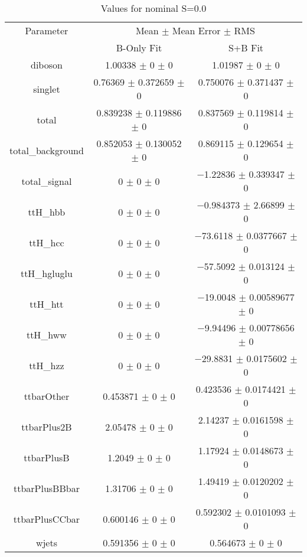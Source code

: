 \begin{table}
\centering
\caption{Values for nominal S=0.0}
\begin{tabular}{ccc}
\toprule
Parameter & \multicolumn{2}{c}{Mean $\pm$ Mean Error $\pm$ RMS}\\
 & B-Only Fit & S+B Fit\\
\midrule
diboson & \num{1.00338} $\pm$ \num{0} $\pm$ \num{0} & \num{1.01987} $\pm$ \num{0} $\pm$ \num{0}\\
singlet & \num{0.76369} $\pm$ \num{0.372659} $\pm$ \num{0} & \num{0.750076} $\pm$ \num{0.371437} $\pm$ \num{0}\\
total & \num{0.839238} $\pm$ \num{0.119886} $\pm$ \num{0} & \num{0.837569} $\pm$ \num{0.119814} $\pm$ \num{0}\\
total\_background & \num{0.852053} $\pm$ \num{0.130052} $\pm$ \num{0} & \num{0.869115} $\pm$ \num{0.129654} $\pm$ \num{0}\\
total\_signal & \num{0} $\pm$ \num{0} $\pm$ \num{0} & \num{-1.22836} $\pm$ \num{0.339347} $\pm$ \num{0}\\
ttH\_hbb & \num{0} $\pm$ \num{0} $\pm$ \num{0} & \num{-0.984373} $\pm$ \num{2.66899} $\pm$ \num{0}\\
ttH\_hcc & \num{0} $\pm$ \num{0} $\pm$ \num{0} & \num{-73.6118} $\pm$ \num{0.0377667} $\pm$ \num{0}\\
ttH\_hgluglu & \num{0} $\pm$ \num{0} $\pm$ \num{0} & \num{-57.5092} $\pm$ \num{0.013124} $\pm$ \num{0}\\
ttH\_htt & \num{0} $\pm$ \num{0} $\pm$ \num{0} & \num{-19.0048} $\pm$ \num{0.00589677} $\pm$ \num{0}\\
ttH\_hww & \num{0} $\pm$ \num{0} $\pm$ \num{0} & \num{-9.94496} $\pm$ \num{0.00778656} $\pm$ \num{0}\\
ttH\_hzz & \num{0} $\pm$ \num{0} $\pm$ \num{0} & \num{-29.8831} $\pm$ \num{0.0175602} $\pm$ \num{0}\\
ttbarOther & \num{0.453871} $\pm$ \num{0} $\pm$ \num{0} & \num{0.423536} $\pm$ \num{0.0174421} $\pm$ \num{0}\\
ttbarPlus2B & \num{2.05478} $\pm$ \num{0} $\pm$ \num{0} & \num{2.14237} $\pm$ \num{0.0161598} $\pm$ \num{0}\\
ttbarPlusB & \num{1.2049} $\pm$ \num{0} $\pm$ \num{0} & \num{1.17924} $\pm$ \num{0.0148673} $\pm$ \num{0}\\
ttbarPlusBBbar & \num{1.31706} $\pm$ \num{0} $\pm$ \num{0} & \num{1.49419} $\pm$ \num{0.0120202} $\pm$ \num{0}\\
ttbarPlusCCbar & \num{0.600146} $\pm$ \num{0} $\pm$ \num{0} & \num{0.592302} $\pm$ \num{0.0101093} $\pm$ \num{0}\\
wjets & \num{0.591356} $\pm$ \num{0} $\pm$ \num{0} & \num{0.564673} $\pm$ \num{0} $\pm$ \num{0}\\
\bottomrule
\end{tabular}
\end{table}